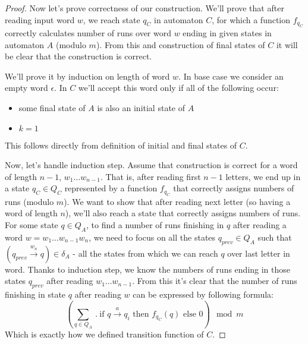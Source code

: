 \documentclass[12pt]{article}
\theoremstyle{definition}
\begin{document}
\begin{proof}
    Now let's prove correctness of our construction. We'll prove that after reading input word $w$, we reach state $q_C$ in automaton $C$, for which a function $f_{q_C}$ correctly calculates number of runs over word $w$ ending in given states in automaton $A$ (modulo $m$). From this and construction of final states of $C$ it will be clear that the construction is correct.

    We'll prove it by induction on length of word $w$.
    In base case we consider an empty word $\epsilon$. In $C$ we'll accept this word only if all of the following occur:
    \begin{itemize}
        \item some final state of $A$ is also an initial state of $A$
        \item $k = 1$
    \end{itemize}
    This follows directly from definition of initial and final states of $C$.
    
    Now, let's handle induction step. Assume that construction is correct for a word of length $n-1$, $w_1 \ldots w_{n-1}$. That is, after reading first $n-1$ letters, we end up in a state $q_C \in Q_C$ represented by a function $f_{q_C}$ that correctly assigns numbers of runs (modulo $m$). We want to show that after reading next letter (so having a word of length $n$), we'll also reach a state that correctly assigns numbers of runs. For some state $q \in Q_A$, to find a number of runs finishing in $q$ after reading a word $w = w_1\ldots w_{n-1}w_n$, we need to focus on all the states $q_{prev} \in Q_A$ such that $(q_{prev} \xrightarrow{w_n} q) \in \delta_A$ - all the states from which we can reach $q$ over last letter in word. Thanks to induction step, we know the numbers of runs ending in those states $q_{prev}$ after reading $w_1 \ldots w_{n-1}$. From this it's clear that the number of runs finishing in state $q$ after reading $w$ can be expressed by following formula:
    $$(\sum_{q \in Q_A} \ . \ \text{if } q \xrightarrow{a} q_i \text{ then } f_{q_C}(q) \text{ else } 0) \mod m$$
    Which is exactly how we defined transition function of $C$.



\end{proof}
\end{document}
